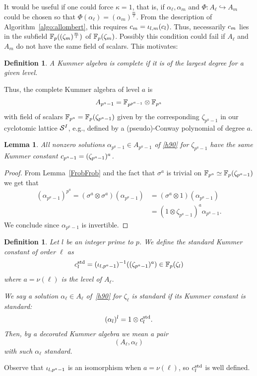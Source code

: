 \documentclass[sigconf]{acmart}
\newtheorem{lemma}[theorem]{Lemma}
\newtheorem{definition}[theorem]{Definition}
\begin{document}
It would be useful if one could force $\kappa=1$, that is, if $\alpha_\ell,\alpha_m$
and $\Phi:A_\ell\hookrightarrow A_m$
could be chosen so that $\Phi(\alpha_\ell)=(\alpha_m)^{\frac{m}{\ell}}$.
From the description of Algorithm~\ref{algo:allombert},
this requires $c_m={\iota_{{l},{m}}}(c_l)$.
Thus,
necessarily $c_m$ lies in the subfield $\mathbb{F}_{p}((\zeta_m)^{\frac{m}{l}})$ of $\mathbb{F}_{p}(\zeta_m)$.
Possibly this condition could fail if $A_\ell$ and $A_m$ do not have the same field of scalars.
This motivates:
\begin{definition}
\label{complete}
A Kummer algebra is \emph{complete} if it is of the largest degree for a given level.
\end{definition}
Thus, the complete Kummer algebra of level $a$ is
\[ A_{p^a-1}=\mathbb{F}_{p^{p^a-1}}\otimes\mathbb{F}_{p^a} \]
with field of scalars $\mathbb{F}_{p^a}=\mathbb{F}_{p}(\zeta_{p^a-1})$ given by the corresponding $\zeta_{p^a-1}$ in our cyclotomic lattice $\mathcal{S}^{I}$,
e.g., defined by a (pseudo)-Conway polynomial of degree $a$.
\begin{lemma}
\label{Kummer_bizarre}
All nonzero solutions $\alpha_{p^a-1}\in A_{p^a-1}$ of \eqref{h90} for $\zeta_{p^a-1}$
have the same Kummer constant $c_{p^a-1}=(\zeta_{p^a-1})^a$.
\end{lemma}
\begin{proof}
  From Lemma~\ref{FrobFrob} and the fact that $\sigma^a$ is trivial on
  $\mathbb{F}_{p^a}\simeq\mathbb{F}_{p}(\zeta_{p^a-1})$ we get that
\begin{equation*}
\begin{split}
(\alpha_{p^a-1})^{p^a}=(\sigma^a\otimes\sigma^a)(\alpha_{p^a-1})&=(\sigma^a\otimes1)(\alpha_{p^a-1})\\
&=(1\otimes\zeta_{p^a-1})^a\alpha_{p^a-1}.
\end{split}
\end{equation*}
We conclude since $\alpha_{p^a-1}$ is invertible.
\end{proof}
\begin{definition}
\label{alphastandard}
Let $l$ be an integer prime to $p$.
We define the \emph{standard} Kummer constant of order $\ell$ as
\[ c^{\mathrm{std}}_{l}=({\iota_{{l},{p^a-1}}})^{-1}((\zeta_{p^a-1})^a)\in\mathbb{F}_p(\zeta_l) \]
where $a=\nu(\ell)$ is the level of $A_\ell$.

We say a solution $\alpha_\ell\in A_\ell$ of~\eqref{h90} for $\zeta_\ell$ is
\emph{standard} if its Kummer constant is standard:
\[ (\alpha_l)^l=1\otimes c^{\mathrm{std}}_{l}. \]
Then, by a \emph{decorated} Kummer algebra we mean a pair
\[ (A_\ell,\alpha_{\ell}) \]
with such $\alpha_\ell$ standard.
\end{definition}
Observe that ${\iota_{{l},{p^a-1}}}$ is an isomorphism when $a=\nu(\ell)$,
so $c^{\mathrm{std}}_l$ is well defined.
\end{document}
